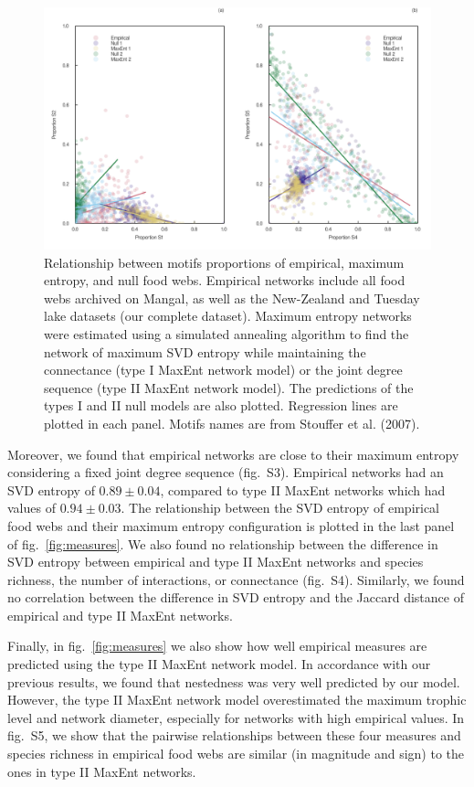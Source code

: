 \documentclass[10pt,oneside]{article}
\makeatletter
\def\maxwidth{\ifdim\Gin@nat@width>\linewidth\linewidth
\else\Gin@nat@width\fi}
\let\Oldincludegraphics\includegraphics
\renewcommand{\includegraphics}[1]{\Oldincludegraphics[width=\maxwidth]{#1}}
\makeatother
\begin{document}
\begin{figure}
\hypertarget{fig:motifs_rel}{%
\centering
\includegraphics{figures/motifs_relations.png}
\caption{Relationship between motifs proportions of empirical, maximum
entropy, and null food webs. Empirical networks include all food webs
archived on Mangal, as well as the New-Zealand and Tuesday lake datasets
(our complete dataset). Maximum entropy networks were estimated using a
simulated annealing algorithm to find the network of maximum SVD entropy
while maintaining the connectance (type I MaxEnt network model) or the
joint degree sequence (type II MaxEnt network model). The predictions of
the types I and II null models are also plotted. Regression lines are
plotted in each panel. Motifs names are from Stouffer et al.
(2007).}\label{fig:motifs_rel}
}
\end{figure}

Moreover, we found that empirical networks are close to their maximum
entropy considering a fixed joint degree sequence (fig.~S3). Empirical
networks had an SVD entropy of \(0.89 \pm 0.04\), compared to type II
MaxEnt networks which had values of \(0.94 \pm 0.03\). The relationship
between the SVD entropy of empirical food webs and their maximum entropy
configuration is plotted in the last panel of fig.~\ref{fig:measures}.
We also found no relationship between the difference in SVD entropy
between empirical and type II MaxEnt networks and species richness, the
number of interactions, or connectance (fig.~S4). Similarly, we found no
correlation between the difference in SVD entropy and the Jaccard
distance of empirical and type II MaxEnt networks.

Finally, in fig.~\ref{fig:measures} we also show how well empirical
measures are predicted using the type II MaxEnt network model. In
accordance with our previous results, we found that nestedness was very
well predicted by our model. However, the type II MaxEnt network model
overestimated the maximum trophic level and network diameter, especially
for networks with high empirical values. In fig.~S5, we show that the
pairwise relationships between these four measures and species richness
in empirical food webs are similar (in magnitude and sign) to the ones
in type II MaxEnt networks.
\end{document}

